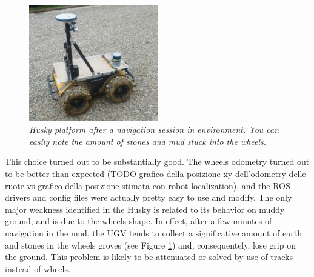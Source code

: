\begin{figure}
	\centering
	\includegraphics[width=0.5\textwidth]{Images/grape_sw_hw_architecture/ruoteFangose.jpeg}
	\caption{\textit{Husky platform after a navigation session in environment. You can easily note the amount of stones and mud stuck into the wheels.}}
	\label{fig:ruoteFangose}
\end{figure}

This choice turned out to be substantially good. The wheels odometry turned out to be  better than expected (TODO grafico della posizione xy dell'odometry delle ruote vs grafico della posizione stimata con robot localization), and the \ac{ROS} drivers and config files were actually pretty easy to use and modify. The only major weakness identified in the Husky is related to its behavior on muddy ground, and is due to the wheels shape. In effect, after a few minutes of navigation in the mud, the \ac{UGV} tends to collect a significative amount of earth and stones in the wheels groves (see Figure \ref{fig:ruoteFangose}) and, consequentely, lose grip on the ground. This problem is likely to be attenuated or solved by use of tracks instead of wheels.


